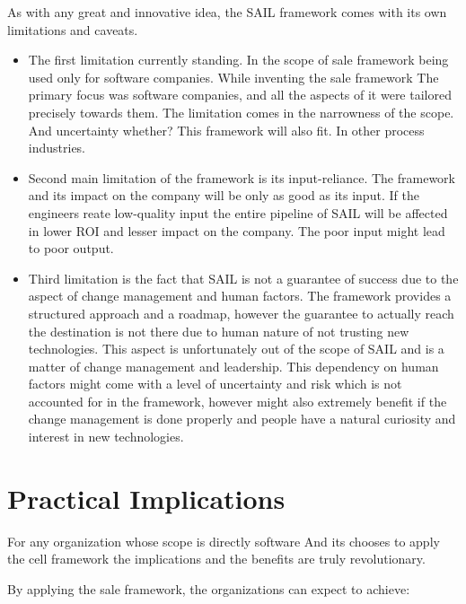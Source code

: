 \documentclass[]{imc-inf}
\begin{document}
As with any great and innovative idea, the SAIL framework comes with its
own limitations and caveats.

\begin{itemize}
	\item
	The first limitation currently standing. In the scope of sale framework being used only for software companies. While inventing the sale framework The primary focus was software companies, and all the aspects of it were tailored precisely towards them. The limitation comes in the narrowness of the scope. And uncertainty whether? This framework will also fit. In other process industries.
	\item
	Second main limitation of the framework is its input-reliance. The
	framework and its impact on the company will be only as good as its
	input. If the engineers reate low-quality input the entire pipeline of
	SAIL will be affected in lower ROI and lesser impact on the company.
	The poor input might lead to poor output.
	\item
	Third limitation is the fact that SAIL is not a guarantee of success
	due to the aspect of change management and human factors. The
	framework provides a structured approach and a roadmap, however the
	guarantee to actually reach the destination is not there due to human
	nature of not trusting new technologies. This aspect is unfortunately
	out of the scope of SAIL and is a matter of change management and
	leadership. This dependency on human factors might come with a level
	of uncertainty and risk which is not accounted for in the framework,
	however might also extremely benefit if the change management is done
	properly and people have a natural curiosity and interest in new
	technologies.
\end{itemize}

\section{Practical Implications}\label{practical-implications}

For any organization whose scope is directly software And its chooses to apply the cell framework the implications and the benefits are truly revolutionary. 

By applying the sale framework, the organizations can expect to achieve:
\end{document}
